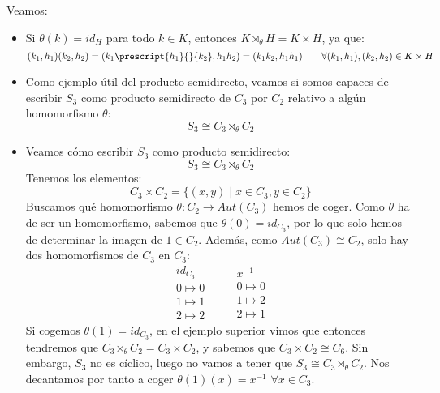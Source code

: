 \begin{ejemplo}
    Veamos:
    \begin{itemize}
        \item Si $\theta(k) = id_H$ para todo $k\in K$, entonces $K\rtimes_\theta H = K\times H$, ya que:
            \begin{equation*}
                (k_1,h_1)(k_2,h_2) = (k_1 \prescript{h_1}{}{k_2}, h_1h_2) = (k_1k_2, h_1h_1) \qquad \forall (k_1,h_1), (k_2,h_2) \in K\times H
            \end{equation*}
        \item Como ejemplo útil del producto semidirecto, veamos si somos capaces de escribir $S_3$ como producto semidirecto de $C_3$ por $C_2$ relativo a algún homomorfismo $\theta$:
            \begin{equation*}
                S_3\cong C_3\rtimes_{\theta} C_2
            \end{equation*}
        \item Veamos cómo escribir $S_3$ como producto semidirecto:
            \begin{equation*}
                S_3 \cong C_3 \rtimes_{\theta} C_2
            \end{equation*}
            Tenemos los elementos:
            \begin{equation*}
                C_3\times C_2 = \{(x,y) \mid x\in C_3, y\in C_2\}
            \end{equation*}
            Buscamos qué homomorfismo $\theta:C_2\to Aut(C_3)$ hemos de coger. Como $\theta$ ha de ser un homomorfismo, sabemos que $\theta(0) = id_{C_3}$, por lo que solo hemos de determinar la imagen de $1\in C_2$. Además, como $Aut(C_3)\cong C_2$, solo hay dos homomorfismos de $C_3$ en $C_3$:
            \begin{equation*}
                \begin{array}{c}
                    id_{C_3} \\
                    0 \longmapsto 0 \\
                    1 \longmapsto 1 \\
                    2 \longmapsto 2
                \end{array} \qquad 
                \begin{array}{c}
                    x^{-1} \\
                    0 \longmapsto 0 \\
                    1 \longmapsto 2 \\
                    2 \longmapsto 1
                \end{array} 
            \end{equation*}
            Si cogemos $\theta(1) = id_{C_3}$, en el ejemplo superior vimos que entonces tendremos que $C_3\rtimes_\theta C_2 = C_3\times C_2$, y sabemos que $C_3\times C_2 \cong C_6$. Sin embargo, $S_3$ no es cíclico, luego no vamos a tener que $S_3 \cong C_3\rtimes_\theta C_2$. Nos decantamos por tanto a coger $\theta(1)(x) = x^{-1}$ $\forall x\in C_3$.\\


\end{itemize}
\end{ejemplo}
